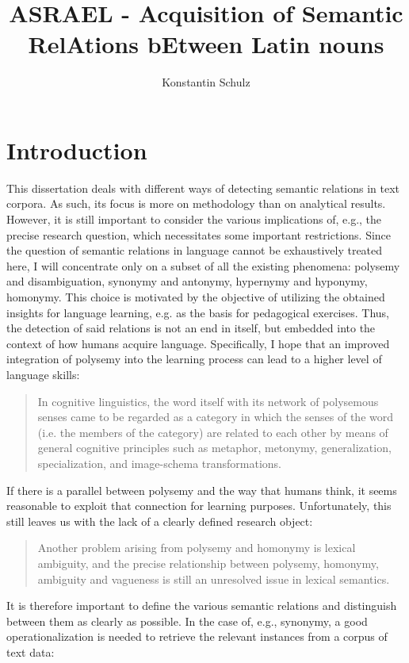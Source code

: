 \documentclass[jou]{apa6} %
\title{ASRAEL - Acquisition of Semantic RelAtions bEtween Latin nouns}
\author{Konstantin Schulz}
\affiliation{Humboldt-Universität zu Berlin}
\begin{document}
\maketitle    
                        
\section{Introduction}

This dissertation deals with different ways of detecting semantic relations in text corpora. As such, its focus is more on methodology than on analytical results. However, it is still important to consider the various implications of, e.g., the precise research question, which necessitates some important restrictions. Since the question of semantic relations in language cannot be exhaustively treated here, I will concentrate only on a subset of all the existing phenomena: polysemy and disambiguation, synonymy and antonymy, hypernymy and hyponymy, homonymy. This choice is motivated by the objective of utilizing the obtained insights for language learning, e.g. as the basis for pedagogical exercises. Thus, the detection of said relations is not an end in itself, but embedded into the context of how humans acquire language. 
Specifically, I hope that an improved integration of polysemy into the learning process can lead to a higher level of language skills: 
 \blockquote[{\cite[p.~5]{nerlichPolysemyFlexibilityIntroduction2003}}]{In cognitive linguistics, the word itself with its network of polysemous senses came to be regarded as a category in which the senses of the word (i.e. the members of the category) are related to each other by means of general cognitive principles such as metaphor, metonymy, generalization, specialization, and image-schema transformations.}
If there is a parallel between polysemy and the way that humans think, it seems reasonable to exploit that connection for learning purposes. Unfortunately, this still leaves us with the lack of a clearly defined research object:
\blockquote[{\cite[p.~4]{nerlichPolysemyFlexibilityIntroduction2003}}]{Another problem arising from polysemy and homonymy is lexical ambiguity, and the precise relationship between polysemy, homonymy, ambiguity and vagueness is still an unresolved issue in lexical semantics.}
It is therefore important to define the various semantic relations and distinguish between them as clearly as possible. In the case of, e.g., synonymy, a good operationalization is needed to retrieve the relevant instances from a corpus of text data:
\end{document}

